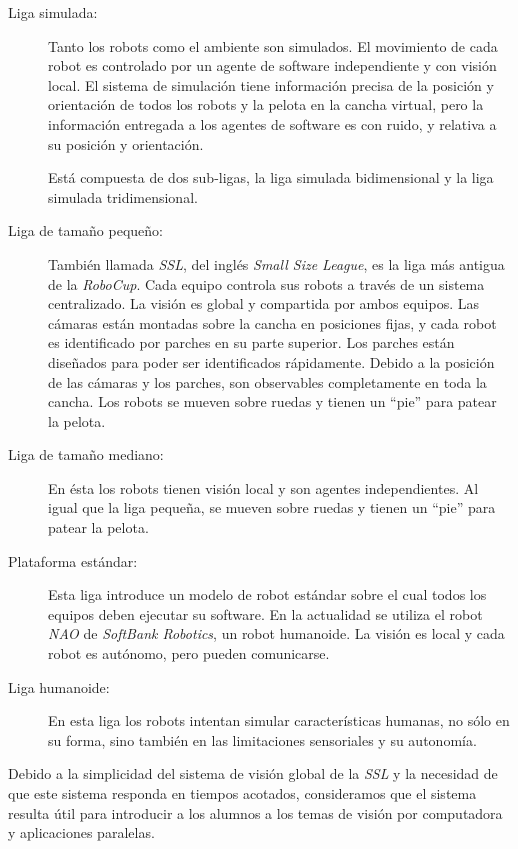 \begin{description}

	\item[Liga simulada:] Tanto los robots como el ambiente son simulados.
		El movimiento de cada robot es controlado por un agente de
		software independiente y con visión local. El sistema de
		simulación tiene información precisa de la posición y
		orientación de todos los robots y la pelota en la cancha
		virtual, pero la información entregada a los agentes de software
		es con ruido, y relativa a su posición y orientación.

		Está compuesta de dos sub-ligas, la liga simulada
		bidimensional y la liga simulada tridimensional.

	\item[Liga de tamaño pequeño:] También llamada \emph{SSL}, del inglés
		\emph{Small Size League}, es la liga más antigua de la
		\emph{RoboCup}. Cada equipo controla sus robots a través de un
		sistema centralizado. La visión es global y compartida por ambos
		equipos. Las cámaras están montadas sobre la cancha en
		posiciones fijas, y cada robot es identificado por parches en su
		parte superior. Los parches están diseñados para poder ser
		identificados rápidamente. Debido a la posición de las cámaras y
		los parches, son observables completamente en toda la cancha.
		Los robots se mueven sobre ruedas y tienen un ``pie'' para
		patear la pelota.

	\item[Liga de tamaño mediano:] En ésta los robots tienen visión local
		y son agentes independientes. Al igual que la liga pequeña, se
		mueven sobre ruedas y tienen un ``pie'' para patear la pelota.

	\item[Plataforma estándar:] Esta liga introduce un modelo de robot
		estándar sobre el cual todos los equipos deben ejecutar su
		software. En la actualidad se utiliza el robot \emph{NAO} de
		\emph{SoftBank Robotics}, un robot humanoide. La visión es
		local y cada robot es autónomo, pero pueden comunicarse.

	\item[Liga humanoide:] En esta liga los robots intentan simular
		características humanas, no sólo en su forma, sino también en
		las limitaciones sensoriales y su autonomía.

\end{description}

Debido a la simplicidad del sistema de visión global de la \emph{SSL} y la
necesidad de que este sistema responda en tiempos acotados, consideramos que el
sistema resulta útil para introducir a los alumnos a los temas de visión por
computadora y aplicaciones paralelas.

